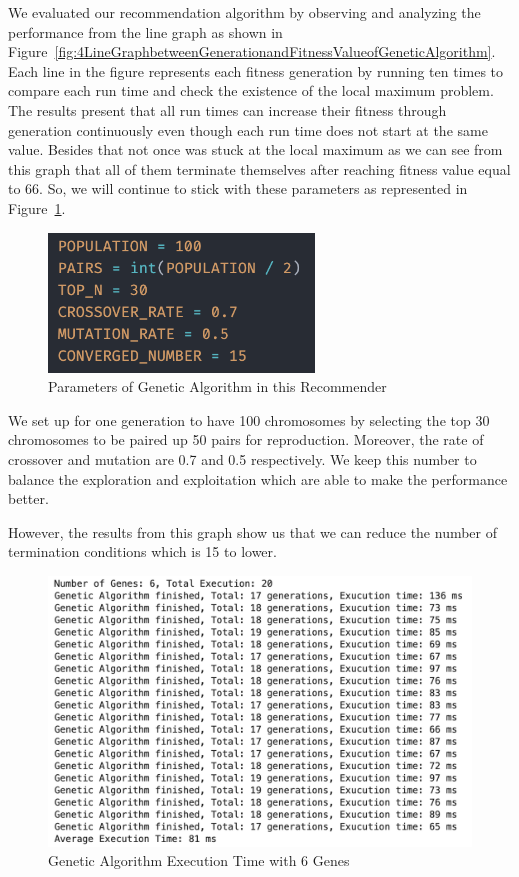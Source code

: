 \documentclass[12pt,oneside,openright,a4paper]{cpe-english-project}
\begin{document}
We evaluated our recommendation algorithm by observing and analyzing the performance from the line graph as shown in Figure~\ref{fig:4LineGraphbetweenGenerationandFitnessValueofGeneticAlgorithm}. Each line in the figure represents each fitness generation by running ten times to compare each run time and check the existence of the local maximum problem. The results present that all run times can increase their fitness through generation continuously even though each run time does not start at the same value. Besides that not once was stuck at the local maximum as we can see from this graph that all of them terminate themselves after reaching fitness value equal to 66. So, we will continue to stick with these parameters as represented in Figure~\ref{fig:4ParametersofGeneticAlgorithminthisRecommender}.

\begin{figure}[H]\centering
\includegraphics[width=200pt]{./images/4ParametersofGeneticAlgorithminthisRecommender.png}
\caption{Parameters of Genetic Algorithm in this Recommender}\label{fig:4ParametersofGeneticAlgorithminthisRecommender}
\end{figure}\vspace{-24pt}

We set up for one generation to have 100 chromosomes by selecting the top 30 chromosomes to be paired up 50 pairs for reproduction. Moreover, the rate of crossover and mutation are 0.7 and 0.5 respectively. We keep this number to balance the exploration and exploitation which are able to make the performance better.

However, the results from this graph show us that we can reduce the number of termination conditions which is 15 to lower.

\begin{figure}[H]\centering
\includegraphics[width=320pt]{./images/4GeneticAlgorithmExecutionTimewith6Genes.png}
\caption{Genetic Algorithm Execution Time with 6 Genes}\label{fig:4GeneticAlgorithmExecutionTimewith6Genes}
\end{figure}\vspace{-24pt}
\end{document}
